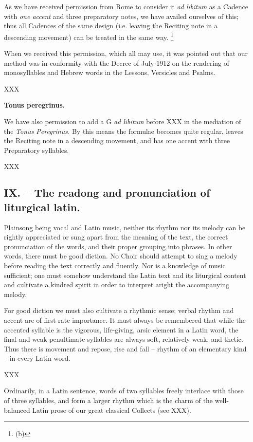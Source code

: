 As we have received permission from Rome to consider it {\it ad libitum} as a Cadence with {\it one accent} and three preparatory notes, we have availed ourselves of this; thus all Cadences of the same design (i.e. leaving the Reciting note in a descending movement) can be treated in the same way. \footnote{(b)}{When we received this permission, which all may use, it was pointed out that our method was in conformity with the Decree of July 1912 on the rendering of monosyllables and Hebrew words in the Lessons, Versicles and Psalms.

XXX

{\bf Tonus peregrinus.}

We have also permission to add a G {\it ad libitum} before XXX in the mediation of the {\it Tonus Peregrinus.} By this means the formulae becomes quite regular, leaves the Reciting note in a descending movement, and has one accent with three Preparatory syllables.

XXX

\subsection{IX. -- The readong and pronunciation of liturgical latin.}

Plainsong being vocal and Latin music, neither its rhythm nor its melody can be rightly appreciated or sung apart from the meaning of the text, the correct pronunciation of the words, and their proper grouping into phrases. In other words, there must be good diction. No Choir should attempt to sing a melody before reading the text correctly and fluently. Nor is a knowledge of music sufficient; one must somehow understand the Latin text and its liturgical content and cultivate a kindred spirit in order to interpret aright the accompanying melody.

For good diction we must also cultivate a rhythmic sense; verbal rhythm and accent are of first-rate importance. It must always be remembered that while the accented syllable is the vigorous, life-giving, arsic element in a Latin word, the final and weak penultimate syllables are always soft, relatively weak, and thetic. Thus there is movement and repose, rise and fall -- rhythm of an elementary kind -- in every Latin word.

XXX

Ordinarily, in a Latin sentence, words of two syllables freely interlace with those of three syllables, and form a larger rhythm which is the charm of the well-balanced Latin prose of our great classical Collects (see XXX).

}
